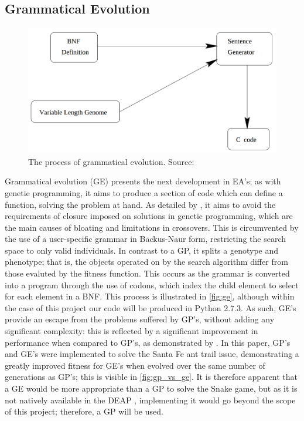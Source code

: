 \documentclass[british,10pt,a4paper]{article}
\begin{document}
\subsection{Grammatical Evolution}
\begin{figure}
\centering
	\includegraphics[width=12cm,keepaspectratio]{images/ge.png}
	\caption{The process of grammatical evolution. Source: \cite{ryan:1998:geepal}}
	\label{fig:ge}
\end{figure}
Grammatical evolution (GE) presents the next development in EA's; as with genetic programming, it aims to produce a section of code which can define a function, solving the problem at hand. As detailed by \citet{ryan:1998:geepal}, it aims to avoid the requirements of closure imposed on solutions in genetic programming, which are the main causes of bloating and limitations in crossovers. This is circumvented by the use of a user-specific grammar in Backus-Naur form, restricting the search space to only valid individuals. In contrast to a GP, it splits a genotype and phenotype; that is, the objects operated on by the search algorithm differ from those evaluted by the fitness function. This occurs as the grammar is converted into a program through the use of codons, which index the child element to select for each element in a BNF. This process is illustrated in \autoref{fig:ge}, although within the case of this project our code will be produced in Python 2.7.3. As such, GE's provide an escape from the problems suffered by GP's, without adding any significant complexity: this is reflected by a significant improvement in performance when compared to GP's, as demonstrated by \citet{Michael_ONeill1999-zi}. In this paper, GP's and GE's were implemented to solve the Santa Fe ant trail issue, demonstrating a greatly improved fitness for GE's when evolved over the same number of generations as GP's; this is visible in \autoref{fig:gp_vs_ge}. It is therefore apparent that a GE would be more appropriate than a GP to solve the Snake game, but as it is not natively available in the DEAP \cite{deap}, implementing it would go beyond the scope of this project; therefore, a GP will be used.
\end{document}
